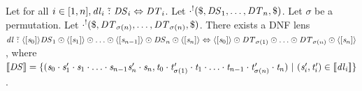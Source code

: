\documentclass[acmsmall]{acmart}
\begin{document}
\begin{lemma}
  \label{lem:conat-perms}
  Let for all $i \in [1,n], \mathit{dl}_i \,\,\tilde{:}\,\,
  \mathit{DS}_i \Leftrightarrow \mathit{DT}_i$.
  Let $\cdot^!(\$,\mathit{DS}_1,\ldots,\mathit{DT}_n,\$)$.
  Let $\sigma$ be a permutation.
  Let $\cdot^!(\$,\mathit{DT}_{\sigma(n)},\ldots,\mathit{DT}_{\sigma(n)},\$)$.
  There exists a DNF lens $\mathit{dl} \,\,\tilde{:}\,\, \langle[\mathit{s}_0]\rangle
  \mathit{DS}_1 \odot \langle[\mathit{s}_1]\rangle \odot
  \ldots \odot \langle[\mathit{s}_{n-1}]\rangle \odot
  \mathit{DS}_n \odot \langle[\mathit{s}_n]\rangle \Leftrightarrow
  \langle[\mathit{s}_0]\rangle \odot \mathit{DT}_{\sigma(1)} \odot \ldots \odot
  \mathit{DT}_{\sigma(n)} \odot \langle[\mathit{s}_n]\rangle$, where $[ \! [\mathit{DS}] \! ] =
  \{(\mathit{s}_0\cdot\mathit{s}_1'\cdot\mathit{s}_1\cdot\ldots\cdot\mathit{s}_{n-1}\mathit{s}_n'\cdot\mathit{s}_n,
    \mathit{t}_0\cdot\mathit{t}_{\sigma(1)}'\cdot\mathit{t}_1\cdot\ldots\cdot\mathit{t}_{n-1}\cdot\mathit{t}_{\sigma(n)}'\cdot\mathit{t}_n)
    ~|~
  (\mathit{s}_i',\mathit{t}_i') \in [ \! [\mathit{dl}_i] \! ]\}$.
\end{lemma}
\end{document}
